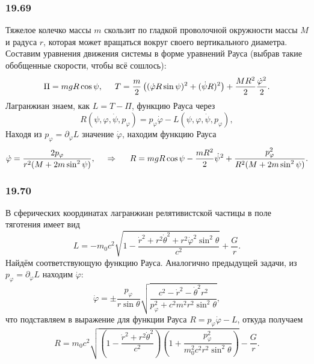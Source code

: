 \subsubsection*{19.69}

Тяжелое колечко массы $m$ скользит по гладкой проволочной окружности массы $M$ и радуса $r$, которая может вращаться вокруг своего вертикального диаметра. Составим уравнения движения системы в форме уравнений Рауса (выбрав такие обобщенные скорости, чтобы всё сошлось):
\begin{equation*}
    \Pi = m g R \cos \psi,
    \hspace{5 mm} 
    T = \frac{m}{2} \left(
        (\dot{\varphi} R \sin \psi)^2 + (\dot{\psi} R)^2
    \right) + \frac{M R^2}{2} \frac{\dot{\varphi}^2}{2}.
\end{equation*}
Лагранжиан знаем, как $L = T - \Pi$, функцию Рауса через
\begin{equation*}
    R(\psi, \varphi, \dot{\psi}, p_\varphi) = p_\varphi \dot{\varphi} - L(\psi, \varphi, \dot{\psi}, p_\varphi),
\end{equation*}
Находя из $p_\varphi = \partial_{\dot{\varphi}} L$ значение $\dot{\varphi}$, находим функцию Рауса
\begin{equation*}
    \dot{\varphi} = \frac{2 p_\varphi}{r^2 (M + 2 m \sin^2 \psi)},
    \hspace{0.5cm} \Rightarrow \hspace{0.5cm}
    R = m g R \cos \psi - \frac{m R^2}{2} \dot{\psi}^2 + \frac{p_\varphi^2}{R^2(M+2m \sin^2 \psi)}.
\end{equation*}



\subsubsection*{19.70}

В сферических координатах лагранжиан релятивистской частицы в поле тяготения имеет вид
\begin{equation*}
    L = - m_0 c^2 \sqrt{1 - \frac{\dot{r}^2 + r^2 \dot{\theta}^2 + r^2 \dot{\varphi}^2 \sin^2 \theta}{c^2}} + \frac{G}{r}.
\end{equation*}
Найдём соответствующую функцию Рауса. Аналогично предыдущей задачи, из $p_\varphi = \partial_{\dot{\varphi}} L$ находим $\dot{\varphi}$:
\begin{equation*}
    \dot{\varphi} = \pm \frac{p_\varphi}{r \sin \theta} \sqrt{
    \frac{c^2 - \dot{r}^2 - \dot{\theta}^2 r^2}{p_\varphi^2 + c^2 m^2 r^2 \sin^2 \theta}
    },
\end{equation*}
что подставляем в выражение для функции Рауса $R = p_\varphi \dot{\varphi} - L$, откуда получаем
\begin{equation*}
    R = m_0 c^2 \sqrt{\left(
        1 - \frac{\dot{r}^2 + r^2 \dot{\theta}^2}{c^2}
    \right)\left(
        1 + \frac{p_\varphi^2}{m_0^2 c^2 r^2 \sin^2 \theta}
    \right)} - \frac{G}{r}.
\end{equation*}


